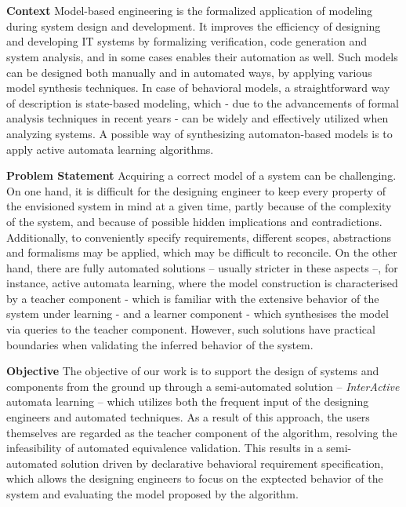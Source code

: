 \chapter{\bevezetes}

\textbf{Context} Model-based engineering is the formalized application of modeling during system design and development. It improves the efficiency of designing and developing IT systems by formalizing verification, code generation and system analysis, and in some cases enables their automation as well. Such models can be designed both manually and in automated ways, by applying various model synthesis techniques. In case of behavioral models, a straightforward way of description is state-based modeling, which - due to the advancements of formal analysis techniques in recent years - can be widely and effectively utilized when analyzing systems. A possible way of synthesizing automaton-based models is to apply active automata learning algorithms. 

\textbf{Problem Statement} Acquiring a correct model of a system can be challenging. On one hand, it is difficult for the designing engineer to keep every property of the envisioned system in mind at a given time, partly because of the complexity of the system, and because of possible hidden implications and contradictions. Additionally, to conveniently specify requirements, different scopes, abstractions and formalisms may be applied, which may be difficult to reconcile. On the other hand, there are fully automated solutions -- usually stricter in these aspects --, for instance, active automata learning, where the model construction is characterised by a teacher component - which is familiar with the extensive behavior of the system under learning - and a learner component - which synthesises the model via queries to the teacher component. However, such solutions have practical boundaries when validating the inferred behavior of the system.

\textbf{Objective} The objective of our work is to support the design of systems and components from the ground up through a semi-automated solution -- \textit{InterActive} automata learning --  which utilizes both the frequent input of the designing engineers and automated techniques. As a result of this approach, the users themselves are regarded as the teacher component of the algorithm, resolving the infeasibility of automated equivalence validation. This results in a semi-automated solution driven by declarative behavioral requirement specification, which allows the designing engineers to focus on the exptected behavior of the system and evaluating the model proposed by the algorithm.

